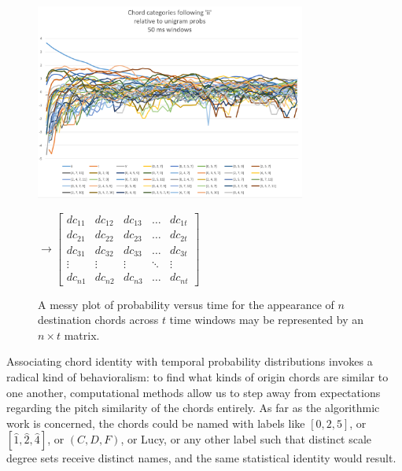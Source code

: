 \begin{figure}
\caption{A messy plot of probability versus time for the appearance of $n$ destination chords across $t$ time windows may be represented by an $n \times t$ matrix.}
	\begin{minipage}{3.5in}
	\includegraphics[width=3.5in]{ii_messy.png}
	\end{minipage}
	\begin{minipage}[r]{1.8in}
	{${
	\boldsymbol{\longrightarrow}
	\begin{bmatrix}
		dc_{11} & dc_{12} & dc_{13} & \dots  & dc_{1t} \\
		dc_{21} & dc_{22} & dc_{23} & \dots  & dc_{2t} \\
		dc_{31} & dc_{32} & dc_{33} & \dots  & dc_{3t} \\
		\vdots 	& \vdots  & \vdots  & \ddots & \vdots  \\
		dc_{n1} & dc_{n2} & dc_{n3} & \dots  & dc_{nt}
	\end{bmatrix}
	}$}
	\end{minipage}
\label{plotToMat}
\end{figure}

Associating chord identity with temporal probability distributions invokes a radical kind of behavioralism: to find what kinds of origin chords are similar to one another, computational methods allow us to step away from expectations regarding the pitch similarity of the chords entirely.  As far as the algorithmic work is concerned, the chords could be named with labels like $[0,2,5]$, or $[\hat{1},\hat{2},\hat{4}]$, or $(C,D,F)$, or Lucy, or any other label such that distinct scale degree sets receive distinct names, and the same statistical identity would result.

